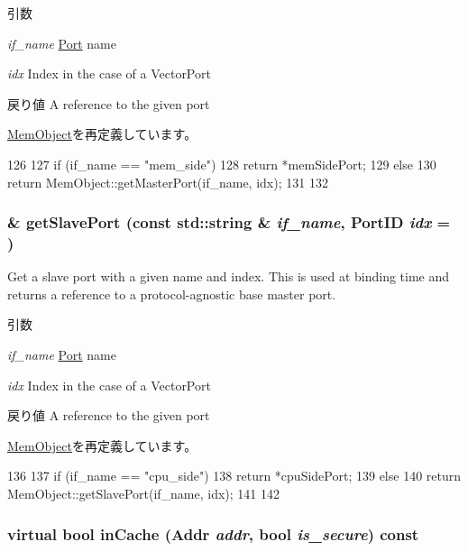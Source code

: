 \begin{DoxyParams}{引数}
\item[{\em if\_\-name}]\hyperlink{classPort}{Port} name \item[{\em idx}]Index in the case of a VectorPort\end{DoxyParams}
\begin{DoxyReturn}{戻り値}
A reference to the given port 
\end{DoxyReturn}


\hyperlink{classMemObject_adc4e675e51defbdd1e354dac729d0703}{MemObject}を再定義しています。


\begin{DoxyCode}
126 {
127     if (if_name == "mem_side") {
128         return *memSidePort;
129     }  else {
130         return MemObject::getMasterPort(if_name, idx);
131     }
132 }
\end{DoxyCode}
\hypertarget{classBaseCache_ac918a145092d7514ebc6dbd952dceafb}{
\subsubsection[{getSlavePort}]{ \& getSlavePort (const std::string \& {\em if\_\-name}, \/  {\bf PortID} {\em idx} = {})}}
\label{classBaseCache_ac918a145092d7514ebc6dbd952dceafb}
Get a slave port with a given name and index. This is used at binding time and returns a reference to a protocol-\/agnostic base master port.


\begin{DoxyParams}{引数}
\item[{\em if\_\-name}]\hyperlink{classPort}{Port} name \item[{\em idx}]Index in the case of a VectorPort\end{DoxyParams}
\begin{DoxyReturn}{戻り値}
A reference to the given port 
\end{DoxyReturn}


\hyperlink{classMemObject_ac918a145092d7514ebc6dbd952dceafb}{MemObject}を再定義しています。


\begin{DoxyCode}
136 {
137     if (if_name == "cpu_side") {
138         return *cpuSidePort;
139     } else {
140         return MemObject::getSlavePort(if_name, idx);
141     }
142 }
\end{DoxyCode}
\hypertarget{classBaseCache_a2ac85ef6d4c6f16111c1da31c2363aa7}{
\subsubsection[{inCache}]{\setlength{\rightskip}{0pt plus 5cm}virtual bool inCache ({\bf Addr} {\em addr}, \/  bool {\em is\_\-secure}) const}}
\label{classBaseCache_a2ac85ef6d4c6f16111c1da31c2363aa7}



